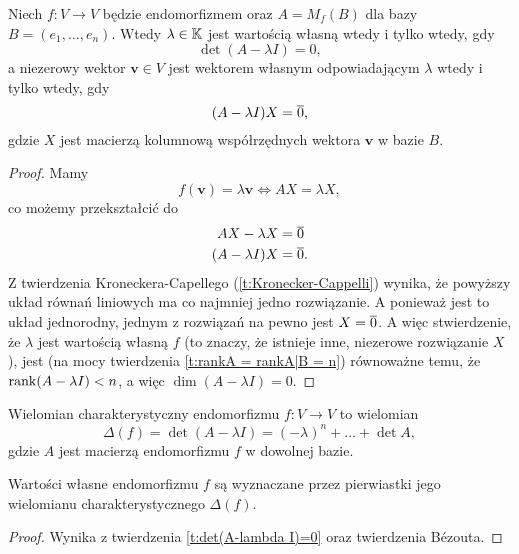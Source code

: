 \begin{theorem}
    \label{t:det(A-lambda I)=0}
    Niech $f : V \to V$ będzie endomorfizmem oraz $A = M_f(B)$ dla bazy $B = (e_1, \ldots, e_n)$. Wtedy $\lambda \in \mathbb K$ jest wartością własną wtedy i tylko wtedy, gdy
    \[ \det(A - \lambda I) = 0, \]
    a niezerowy wektor $\mathbf{v} \in V$ jest wektorem własnym odpowiadającym $\lambda$ wtedy i tylko wtedy, gdy
    \[ (A - \lambda I)X = \overline{0}, \]
    gdzie $X$ jest macierzą kolumnową współrzędnych wektora $\mathbf{v}$ w bazie $B$.
\end{theorem}
\begin{proof}
    Mamy
    \[ f(\mathbf{v}) = \lambda\mathbf{v} \iff AX = \lambda X, \]
    co możemy przekształcić do
    \begin{align*}
        AX - \lambda X &= \overline{0} \\
        (A - \lambda I)X &= \overline{0}.
    \end{align*}
    Z twierdzenia Kroneckera-Capellego (\ref{t:Kronecker-Cappelli}) wynika, że powyższy układ równań liniowych ma co najmniej jedno rozwiązanie. A ponieważ jest to układ jednorodny, jednym z rozwiązań na pewno jest $X = \overline{0}$. A więc stwierdzenie, że $\lambda$ jest wartością własną $f$ (to znaczy, że istnieje inne, niezerowe rozwiązanie $X$), jest (na mocy twierdzenia \ref{t:rankA = rankA|B = n}) równoważne temu, że $\operatorname{rank} (A - \lambda I) < n$, a więc $\dim (A - \lambda I) = 0$.
\end{proof}

\begin{definition}
    Wielomian charakterystyczny endomorfizmu $f : V \to V$ to wielomian
    \[ \Delta(f) = \det(A - \lambda I) = (-\lambda)^n + \ldots + \det A, \]
    gdzie $A$ jest macierzą endomorfizmu $f$ w dowolnej bazie.
\end{definition}

\begin{fact}
    \label{f:roots of the characteristic polynomial are eigenvalues}
    Wartości własne endomorfizmu $f$ są wyznaczane przez pierwiastki jego wielomianu charakterystycznego $\Delta(f)$.
\end{fact}
\begin{proof}
    Wynika z twierdzenia \ref{t:det(A-lambda I)=0} oraz twierdzenia Bézouta.
\end{proof}

